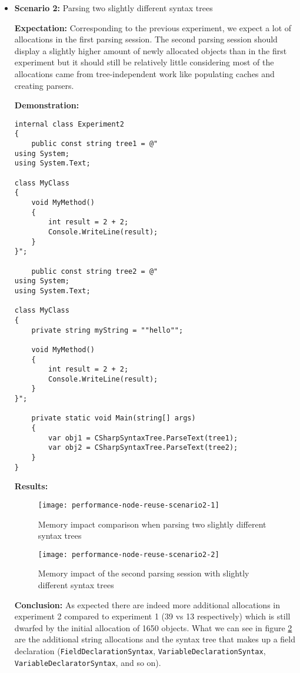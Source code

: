 \begin{itemize}
\item \textbf{Scenario 2:} Parsing two slightly different syntax trees

\textbf{Expectation:} Corresponding to the previous experiment, we expect a lot of allocations in the first parsing session. The second parsing session should display a slightly higher amount of newly allocated objects than in the first experiment but it should still be relatively little considering most of the allocations came from tree-independent work like populating caches and creating parsers.

\textbf{Demonstration:} 

\begin{lstlisting}
internal class Experiment2
{
	public const string tree1 = @"
using System;
using System.Text;

class MyClass 
{
    void MyMethod()
    {
        int result = 2 + 2;
        Console.WriteLine(result);
    }
}";

	public const string tree2 = @"
using System;
using System.Text;

class MyClass 
{
    private string myString = ""hello"";

    void MyMethod()
    {
        int result = 2 + 2;
        Console.WriteLine(result);
    }
}";

	private static void Main(string[] args)
	{
		var obj1 = CSharpSyntaxTree.ParseText(tree1);
		var obj2 = CSharpSyntaxTree.ParseText(tree2);
	}
}
\end{lstlisting}

\textbf{Results:}

\begin{figure}[H]
\centering
\texttt{[image: performance-node-reuse-scenario2-1]}
\caption{Memory impact comparison when parsing two slightly different syntax trees}
\label{img:performance-node-reuse-scenario2-1}
\end{figure}

\begin{figure}[H]
\centering
\texttt{[image: performance-node-reuse-scenario2-2]}
\caption{Memory impact of the second parsing session with slightly different syntax trees}
\label{img:performance-node-reuse-scenario2-2}
\end{figure}

\textbf{Conclusion:} As expected there are indeed more additional allocations in experiment 2 compared to experiment 1 (39 vs 13 respectively) which is still dwarfed by the initial allocation of 1650 objects. What we can see in figure \ref{img:performance-node-reuse-scenario2-2} are the additional string allocations and the syntax tree that makes up a field declaration (\verb|FieldDeclarationSyntax|, \verb|VariableDeclarationSyntax|, \verb|VariableDeclaratorSyntax|, and so on).


\end{itemize}
